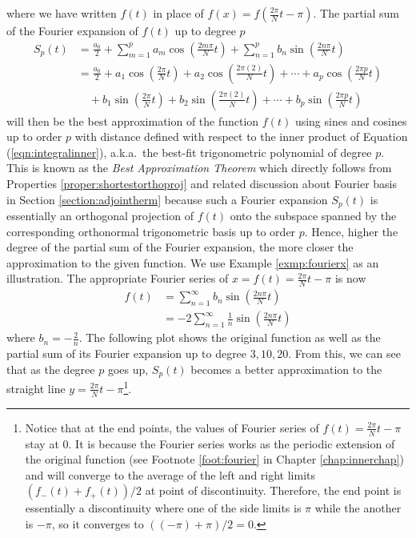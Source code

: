 where we have written $f(t)$ in place of $f(x) = f(\frac{2\pi}{N}t - \pi)$. The partial sum of the Fourier expansion of $f(t)$ up to degree $p$
\begin{align}
S_p(t) &= \frac{a_0}{2} + \sum_{m=1}^{p} a_m \cos(\frac{2m\pi}{N}t) + \sum_{n=1}^{p} b_n \sin(\frac{2n\pi}{N}t) \label{eqn:fourierpart} \\
&= \frac{a_0}{2} + a_1 \cos(\frac{2\pi}{N}t) + a_2 \cos(\frac{2\pi(2)}{N}t) + \cdots + a_p \cos(\frac{2\pi p}{N}t) \nonumber \\
&\quad + b_1 \sin(\frac{2\pi}{N}t) + b_2 \sin(\frac{2\pi(2)}{N}t) + \cdots + b_p \sin(\frac{2\pi p}{N}t) \nonumber
\end{align}
will then be the best approximation of the function $f(t)$ using sines and cosines up to order $p$ with distance defined with respect to the inner product of Equation (\ref{eqn:integralinner}), a.k.a.\ the best-fit trigonometric polynomial of degree $p$. This is known as the \textit{Best Approximation Theorem} which directly follows from Properties \ref{proper:shortestorthoproj} and related discussion about Fourier basis in Section \ref{section:adjointherm} because such a Fourier expansion $S_p(t)$ is essentially an orthogonal projection of $f(t)$ onto the subspace spanned by the corresponding orthonormal trigonometric basis up to order $p$. Hence, higher the degree of the partial sum of the Fourier expansion, the more closer the approximation  to the given function. We use Example \ref{exmp:fourierx} as an illustration. The appropriate Fourier series of $x = f(t) = \frac{2\pi}{N}t - \pi$ is now
\begin{align*}
f(t) &= \sum_{n=1}^{\infty} b_n \sin(\frac{2n\pi}{N}t) \\
&= -2 \sum_{n=1}^{\infty} \frac{1}{n} \sin(\frac{2n\pi}{N}t)
\end{align*}
where $b_n = -\frac{2}{n}$. The following plot shows the original function as well as the partial sum of its Fourier expansion up to degree $3,10,20$. From this, we can see that as the degree $p$ goes up, $S_p(t)$ becomes a better approximation to the straight line $y = \frac{2\pi}{N}t - \pi$\footnote{Notice that at the end points, the values of Fourier series of $f(t) = \frac{2\pi}{N}t - \pi$ stay at $0$. It is because the Fourier series works as the periodic extension of the original function (see Footnote \ref{foot:fourier} in Chapter \ref{chap:innerchap}) and will converge to the average of the left and right limits $(f_-(t) + f_+(t))/2$ at point of discontinuity. Therefore, the end point is essentially a discontinuity where one of the side limits is $\pi$ while the another is $-\pi$, so it converges to $((-\pi) + \pi)/2 = 0$.}. \\
